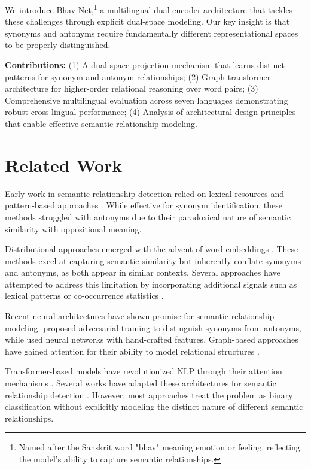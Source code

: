 \documentclass[11pt]{article}
\begin{document}
We introduce Bhav-Net,\footnote{Named after the Sanskrit word "bhav" meaning emotion or feeling, reflecting the model's ability to capture semantic relationships.} a multilingual dual-encoder architecture that tackles these challenges through explicit dual-space modeling. Our key insight is that synonyms and antonyms require fundamentally different representational spaces to be properly distinguished.

\textbf{Contributions:} (1) A dual-space projection mechanism that learns distinct patterns for synonym and antonym relationships; (2) Graph transformer architecture for higher-order relational reasoning over word pairs; (3) Comprehensive multilingual evaluation across seven languages demonstrating robust cross-lingual performance; (4) Analysis of architectural design principles that enable effective semantic relationship modeling.

\section{Related Work}

Early work in semantic relationship detection relied on lexical resources and pattern-based approaches \cite{hearst1992automatic,turney2006similarity}. While effective for synonym identification, these methods struggled with antonyms due to their paradoxical nature of semantic similarity with oppositional meaning.

Distributional approaches emerged with the advent of word embeddings \cite{mikolov2013distributed,pennington2014glove}. These methods excel at capturing semantic similarity but inherently conflate synonyms and antonyms, as both appear in similar contexts. Several approaches have attempted to address this limitation by incorporating additional signals such as lexical patterns \cite{lin2003automatic} or co-occurrence statistics \cite{mohammad2008measuring}.

Recent neural architectures have shown promise for semantic relationship modeling. \citet{chen2018adversarial} proposed adversarial training to distinguish synonyms from antonyms, while \citet{ono2015word} used neural networks with hand-crafted features. Graph-based approaches have gained attention for their ability to model relational structures \cite{speer2017conceptnet,vashishth2018incorporating}.

Transformer-based models have revolutionized NLP through their attention mechanisms \cite{vaswani2017attention,devlin2018bert}. Several works have adapted these architectures for semantic relationship detection \cite{rogers2020primer,liu2019roberta}. However, most approaches treat the problem as binary classification without explicitly modeling the distinct nature of different semantic relationships.
\end{document}
